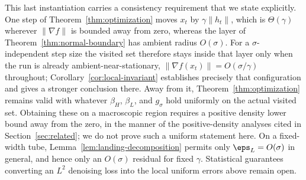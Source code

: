 \documentclass[10pt]{article}
\theoremstyle{c2fup}
\begin{document}
This last instantiation carries a consistency requirement that we state
explicitly.  One step of Theorem~\ref{thm:optimization} moves $x_t$ by
$\gamma\|h_t\|$, which is $\Theta(\gamma)$ wherever $\|\nabla f\|$ is bounded
away from zero, whereas the layer of Theorem~\ref{thm:normal-boundary} has
ambient radius $O(\sigma)$.  For a $\sigma$-independent step size the visited
set therefore stays inside that layer only when the run is already ambient-near-stationary, $\|\nabla f(x_t)\|=O(\sigma/\gamma)$ throughout;
Corollary~\ref{cor:local-invariant} establishes precisely that configuration and
gives a stronger conclusion there.  Away from it, Theorem~\ref{thm:optimization}
remains valid with whatever $\beta_H$, $\beta_L$, and $g_\sigma$ hold uniformly
on the actual visited set.  Obtaining these on a macroscopic region requires a
positive density lower bound away from the zero, in the manner of the
positive-density analyses cited in Section~\ref{sec:related}; we do not prove
such a uniform statement here.  On a fixed-width
tube, Lemma~\ref{lem:landing-decomposition} permits only
$\eps_L=O(\sigma)$ in general, and hence only an $O(\sigma)$ residual for fixed
$\gamma$.  Statistical guarantees converting an $L^2$ denoising loss into
the local uniform errors above remain open.
\end{document}
